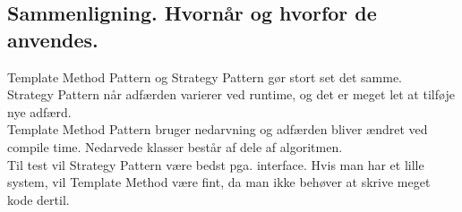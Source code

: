 \documentclass[../SWD_disp.tex]{subfiles}
\begin{document}
\subsection*{Sammenligning. Hvornår og hvorfor de anvendes.}
Template Method Pattern og Strategy Pattern gør stort set det samme.
\\

Strategy Pattern når adfærden varierer ved runtime, og det er meget let at tilføje nye adfærd.
\\

Template Method Pattern bruger nedarvning og adfærden bliver ændret ved compile time. Nedarvede klasser består af dele af algoritmen.
\\

Til test vil Strategy Pattern være bedst pga. interface. Hvis man har et lille system, vil Template Method være fint, da man ikke behøver at skrive meget kode dertil.
\end{document}
